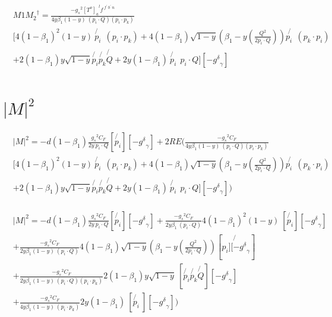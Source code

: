 \begin{equation}
\begin{split}
&M1{M_2}^{\dagger}=\frac{-{g_s}^2 {[T^{o}]_a}^{l} f^{\:f^{\prime}\: b^{\prime}\:n}}{4y\beta_1 (1-y)\:(p_i \cdot Q)(p_i \cdot p_k)}\\
&[4(1-\beta_1)^2 (1-y)\:\not{p_i}\:\:(p_i \cdot p_k) + 4(1-\beta_1)\sqrt{1-y}(\beta_1 - y(\frac{Q^2}{2p_i \cdot Q}))\not{p_i\:\:}(p_k\cdot p_i)\\
&+ 2(1-\beta_1)y\sqrt{1-y}\not{p_i}\not{p_k}\not{Q}+2y(1-\beta_1)\:\not{p_i}\:\:p_i\cdot Q][-{g^{\delta}}_{\gamma}]\\
\end{split}
\end{equation}

\section{$ |M|^2 $}

\begin{equation}
\begin{split}
&|M|^2=-d(1-\beta_1)\frac{{g_s}^2 C_F}{2y \:p_i \cdot Q}
[  \not{p_i}][-{g^{\delta}}_{\gamma}]+2RE(\frac{-{g_s}^2 C_F}{4y\beta_1 (1-y)\:(p_i \cdot Q)(p_i \cdot p_k)}\\
&[4(1-\beta_1)^2 (1-y)\:\not{p_i}\:\:(p_i \cdot p_k) + 4(1-\beta_1)\sqrt{1-y}(\beta_1 - y(\frac{Q^2}{2p_i \cdot Q}))\not{p_i\:\:}(p_k\cdot p_i)\\
&+ 2(1-\beta_1)y\sqrt{1-y}\not{p_i}\not{p_k}\not{Q}+2y(1-\beta_1)\:\not{p_i}\:\:p_i\cdot Q][-{g^{\delta}}_{\gamma}])\\
\end{split}
\end{equation}

\begin{equation}
\begin{split}
&|M|^2=-d(1-\beta_1)\frac{{g_s}^2 C_F}{2y \:p_i \cdot Q}
[  \not{p_i}][-{g^{\delta}}_{\gamma}]+\frac{-{g_s}^2 C_F}{2y\beta_1 \:(p_i \cdot Q)}4(1-\beta_1)^2 (1-y)\:[\not{p_i}][-{g^{\delta}}_{\gamma}]\:\\
&+\frac{-{g_s}^2 C_F}{2y\beta_1 (1-y)\:(p_i \cdot Q)} 4(1-\beta_1)\sqrt{1-y}(\beta_1 - y(\frac{Q^2}{2p_i \cdot Q}))[\not{p_i][-{g^{\delta}}_{\gamma}}]\\
&+\frac{-{g_s}^2 C_F}{2y\beta_1 (1-y)\:(p_i \cdot Q)(p_i \cdot p_k)} 2(1-\beta_1)y\sqrt{1-y}\:[\not{p_i}\not{p_k}\not{Q}][-{g^{\delta}}_{\gamma}]\\
&+\frac{-{g_s}^2 C_F}{4y\beta_1 (1-y)\:(p_i \cdot p_k)}2y(1-\beta_1)\:[\not{p_i}\:][-{g^{\delta}}_{\gamma}])\\
\end{split}
\end{equation}

